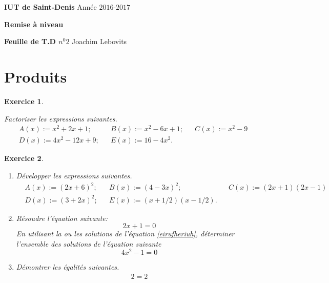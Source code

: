 \documentclass [10pt,a4paper] {article}
\newtheorem{exo}{Exercice}
\renewcommand\theequation{\thesection.\arabic{equation}}
\begin{document}
\setlength{\parindent}{0em}
\makeatletter
\renewcommand\theequation{\thesection.\arabic{equation}}
\makeatother


\begin{flushleft}
{ \bfseries IUT de Saint-Denis}			\hspace{9.25cm}				Année $2016$-$2017$

{ \bfseries Remise à niveau	}					

{ \bfseries Feuille de T.D $n^{0}2$}		 \hspace{9.5cm} Joachim Lebovits
\end{flushleft}




\date\today




\vspace{1cm}


\section{Produits}

\begin{exo}%

\textcolor{white}{s}

Factoriser les expressions suivantes.
\begin{align*}
 &A(x):= x^{2}+2x+1;&  &B(x):=x^{2}-6x+1;& 
 &C(x):=x^{2}-9&\\
&D(x):= 4x^{2}-12x+9;& &E(x):= 16-4x^{2}.&
\end{align*}
\end{exo}


\begin{exo}%


\begin{enumerate}
\item Développer les expressions suivantes.
\begin{align*}
 &A(x):= (2x+6)^{2};&  &B(x):= (4-3x)^{2};& 
 &C(x):=(2x+1)(2x-1)&\\
&D(x):= (3+2x)^{2};& &E(x):= (x+1/2)(x-1/2).&
\end{align*}
\item Résoudre l'équation suivante:
\begin{equation}
 \label{eirufheriuh}
 2x+1=0
\end{equation}
En utilisant la ou les solutions de l'équation \eqref{eirufheriuh}, déterminer l'ensemble des solutions de l'équation suivante
\begin{equation*}
 4x^{2}-1=0
\end{equation*}
 
\item Démontrer les égalités suivantes.
\begin{align*}
2=2
 \end{align*}
\end{enumerate}





\end{exo}
\end{document}

